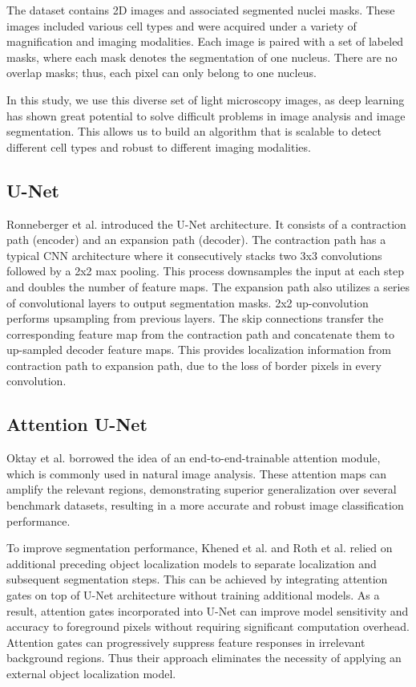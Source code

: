 \documentclass[conference]{IEEEtran}
\begin{document}
The dataset contains 2D images and associated segmented nuclei masks. These images included various cell types and were acquired under a variety of magnification and imaging modalities. Each image is paired with a set of labeled masks, where each mask denotes the segmentation of one nucleus. There are no overlap masks; thus, each pixel can only belong to one nucleus.

In this study, we use this diverse set of light microscopy images, as deep learning has shown great potential to solve difficult problems in image analysis and image segmentation. This allows us to build an algorithm that is scalable to detect different cell types and robust to different imaging modalities.

\subsection{U-Net}

Ronneberger et al.\cite{ronneberger2015u} introduced the U-Net architecture. It consists of a contraction path (encoder) and an expansion path (decoder). The contraction path has a typical CNN architecture where it consecutively stacks two 3x3 convolutions followed by a 2x2 max pooling. This process downsamples the input at each step and doubles the number of feature maps. The expansion path also utilizes a series of convolutional layers to output segmentation masks. 2x2 up-convolution performs upsampling from previous layers. The skip connections transfer the corresponding feature map from the contraction path and concatenate them to up-sampled decoder feature maps. This provides localization information from contraction path to expansion path, due to the loss of border pixels in every convolution. 

\subsection{Attention U-Net}

Oktay et al.\cite{oktay2018attention} borrowed the idea of an end-to-end-trainable attention module\cite{jetley2018learn}, which is commonly used in natural image analysis. These attention maps can amplify the relevant regions, demonstrating superior generalization over several benchmark datasets, resulting in a more accurate and robust image classification performance.

To improve segmentation performance, Khened et al.\cite{khened2019fully} and Roth et al.\cite{roth2018spatial} relied on additional preceding object localization models to separate localization and subsequent segmentation steps. This can be achieved by integrating attention gates on top of U-Net architecture without training additional models. As a result, attention gates incorporated into U-Net can improve model sensitivity and accuracy to foreground pixels without requiring significant computation overhead. Attention gates can progressively suppress feature responses in irrelevant background regions. Thus their approach eliminates the necessity of applying an external object localization model.
\end{document}
